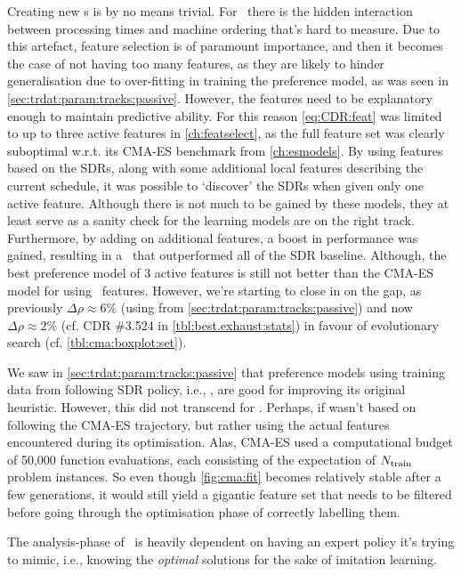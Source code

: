 Creating new \dr s is by no means trivial. For \jsp\ there is 
the hidden interaction between processing times and machine ordering that's 
hard to measure.
Due to this artefact, feature selection is of paramount importance, and then it 
becomes the case of not having too many features, as they are likely to hinder 
generalisation due to over-fitting in training the preference model, as was 
seen in \cref{sec:trdat:param:tracks:passive}. 
However, the features need to be explanatory enough to maintain predictive 
ability. 
For this reason \cref{eq:CDR:feat} was limited to up to three active features 
in \cref{ch:featselect}, as the full feature set was clearly suboptimal 
w.r.t. its CMA-ES benchmark from \cref{ch:esmodels}. 
By using features based on the SDRs, along with some additional local features 
describing the current schedule, it was possible to `discover' the SDRs when 
given only one active feature. 
Although there is not much to be gained by these models, they at least serve as 
a sanity check for the learning models are on the right track. 
Furthermore, by adding on additional features, a boost in performance was 
gained, resulting in a \cdr\ that outperformed all of the SDR baseline. 
Although, the best preference model of 3 active features is still not better 
than the CMA-ES model for  using \NrFeatLocal\ features. 
However, we're starting to close in on the gap, as previously 
$\Delta\rho\approx6\%$ (using  from 
\cref{sec:trdat:param:tracks:passive}) and now $\Delta\rho\approx2\%$ (cf. 
CDR \#3.524 in \cref{tbl:best.exhaust:stats}) in favour of evolutionary 
search (cf. \cref{tbl:cma:boxplot:set}).



We saw in \cref{sec:trdat:param:tracks:passive} that preference models using 
training data from following SDR policy, i.e., \PhiSet{\SDR}, are good for 
improving its original heuristic. However, this did not transcend for 
\PhiSet{\CMAES}.
Perhaps, if \PhiSet{\CMAES} wasn't based on following the CMA-ES trajectory, 
but rather using the actual features encountered during its optimisation. 
Alas, CMA-ES used a computational budget of 50,000 function evaluations, each 
consisting of the expectation of $N_{\text{train}}$ problem instances. 
So even though \cref{fig:cma:fit} becomes relatively stable after a few 
generations, it would still yield a gigantic feature set that needs to be 
filtered before going through the optimisation phase of correctly labelling 
them.

The analysis-phase of \Alice\ is heavily dependent on having an expert 
policy it's trying to mimic, i.e., knowing the \emph{optimal} solutions for the 
sake of imitation learning. 

